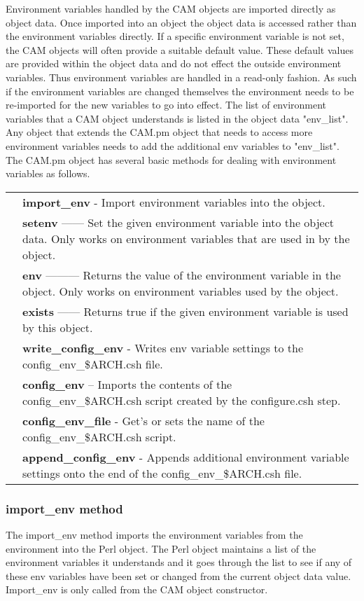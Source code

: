 \documentclass[]{article}
\begin{document}
Environment variables handled by the CAM objects are imported directly as object data.
Once imported into an object the object data is accessed rather than the environment
variables directly. If a specific environment variable is not set, the CAM objects will
often provide a suitable default value. These default values are provided within the object
data and do not effect the outside environment variables. Thus environment variables are
handled in a read-only fashion. As such if the environment variables are changed themselves
the environment needs to be re-imported for the new variables to go into effect. The list
of environment variables that a CAM object understands is listed in the object data "env\_list".
Any object that extends the CAM.pm object that needs to access more environment variables 
needs to add the additional env variables to "env\_list". The CAM.pm
object has several basic methods for dealing with environment variables as follows.\\
\begin{tabular}{r p{3.7in}}
& {\bf import\_env} - Import environment variables into the object. \\
& {\bf setenv} ------ Set the given environment variable into the object data. Only works
                on environment variables that are used in by the object. \\
& {\bf env} --------- Returns the value of the environment variable in the object. Only works
                on environment variables used by the object. \\
& {\bf exists} ------ Returns true if the given environment variable is used by this object. \\
& {\bf write\_config\_env} - Writes env variable settings to the config\_env\_\$ARCH.csh file.\\
& {\bf config\_env} -- Imports the contents of the config\_env\_\$ARCH.csh script created by the
		configure.csh step.\\
& {\bf config\_env\_file} - Get's or sets the name of the config\_env\_\$ARCH.csh script. \\
& {\bf append\_config\_env} - Appends additional environment variable settings onto the end of
              the config\_env\_\$ARCH.csh file.
\end{tabular}
\subsubsection{import\_env method}
The import\_env method imports the environment variables from the environment into the Perl 
object. The Perl object maintains a list of the environment variables it understands and it
goes through the list to see if any of these env variables have been set or changed from the
current object data value. Import\_env is only called from the CAM object
constructor.
\end{document}
